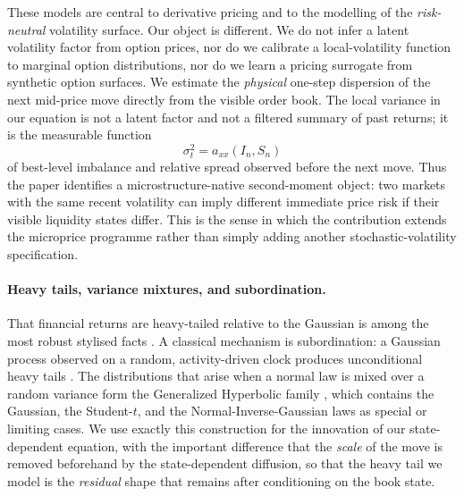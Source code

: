 \documentclass[11pt]{article}
\theoremstyle{plain}
\theoremstyle{definition}
\newcommand{\axx}{a_{xx}}
\begin{document}
These models are central to derivative pricing and to the modelling of the
\emph{risk-neutral} volatility surface. Our object is different. We do not infer a
latent volatility factor from option prices, nor do we calibrate a local-volatility
function to marginal option distributions, nor do we learn a pricing surrogate from
synthetic option surfaces. We estimate the \emph{physical} one-step dispersion of the
next mid-price move directly from the visible order book. The local variance in our
equation is not a latent factor and not a filtered summary of past returns; it is the
measurable function
\[
  \sigma_t^2 = \axx(I_n,S_n)
\]
of best-level imbalance and relative spread observed before the next move. Thus the
paper identifies a microstructure-native second-moment object: two markets with the
same recent volatility can imply different immediate price risk if their visible
liquidity states differ. This is the sense in which the contribution extends the
microprice programme rather than simply adding another stochastic-volatility
specification.

\paragraph{Heavy tails, variance mixtures, and subordination.}
That financial returns are heavy-tailed relative to the Gaussian is among the most
robust stylised facts \citep{cont2001}. A classical mechanism is subordination: a
Gaussian process observed on a random, activity-driven clock produces unconditional
heavy tails \citep{clark1973}. The distributions that arise when a normal law is
mixed over a random variance form the Generalized Hyperbolic family
\citep{barndorffnielsen1977,barndorffnielsen1997}, which contains the Gaussian, the
Student-$t$, and the Normal-Inverse-Gaussian laws as special or limiting cases. We
use exactly this construction for the innovation of our state-dependent equation,
with the important difference that the \emph{scale} of the move is removed
beforehand by the state-dependent diffusion, so that the heavy tail we model is the
\emph{residual} shape that remains after conditioning on the book state.
\end{document}
